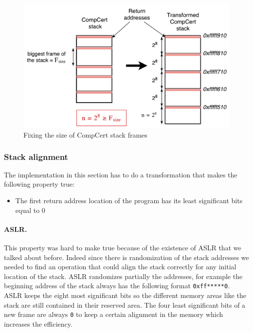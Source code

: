 \documentclass[11pt]{sdm}
\begin{document}
\begin{figure}[!ht]
\centering
\includegraphics[scale=0.6]{images/stack_transform.pdf}
\caption{Fixing the size of CompCert stack frames}
\label{stack_transform}
\end{figure}

\subsubsection{Stack alignment}
\label{ssub:Stack alignment}

The implementation in this section has to do a transformation that makes the following property true:
\begin{itemize}
	\item The first return address location of the program has its least significant bits equal to 0
\end{itemize}

\paragraph{ASLR.}
\label{par:ASLR}

This property was hard to make true because of the existence of ASLR that we talked about before. Indeed since there is randomization of the stack addresses we needed to find an operation that could align the stack correctly for any initial location of the stack. ASLR randomizes partially the addresses, for example the beginning address of the stack always has the following format \texttt{0xff*****0}. 
ASLR keeps the eight most significant bits so the different memory areas like the stack are still contained in their reserved area. The four least significant bits of a new frame are always \texttt{0} to keep a certain alignment in the memory which increases the efficiency.
\hfill \break
\end{document}
